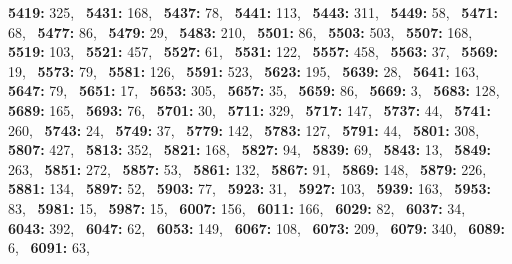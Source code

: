 \textbf{5419:} 325,\allowbreak~ 
\textbf{5431:} 168,\allowbreak~ 
\textbf{5437:} 78,\allowbreak~ 
\textbf{5441:} 113,\allowbreak~ 
\textbf{5443:} 311,\allowbreak~ 
\textbf{5449:} 58,\allowbreak~ 
\textbf{5471:} 68,\allowbreak~ 
\textbf{5477:} 86,\allowbreak~ 
\textbf{5479:} 29,\allowbreak~ 
\textbf{5483:} 210,\allowbreak~ 
\textbf{5501:} 86,\allowbreak~ 
\textbf{5503:} 503,\allowbreak~ 
\textbf{5507:} 168,\allowbreak~ 
\textbf{5519:} 103,\allowbreak~ 
\textbf{5521:} 457,\allowbreak~ 
\textbf{5527:} 61,\allowbreak~ 
\textbf{5531:} 122,\allowbreak~ 
\textbf{5557:} 458,\allowbreak~ 
\textbf{5563:} 37,\allowbreak~ 
\textbf{5569:} 19,\allowbreak~ 
\textbf{5573:} 79,\allowbreak~ 
\textbf{5581:} 126,\allowbreak~ 
\textbf{5591:} 523,\allowbreak~ 
\textbf{5623:} 195,\allowbreak~ 
\textbf{5639:} 28,\allowbreak~ 
\textbf{5641:} 163,\allowbreak~ 
\textbf{5647:} 79,\allowbreak~ 
\textbf{5651:} 17,\allowbreak~ 
\textbf{5653:} 305,\allowbreak~ 
\textbf{5657:} 35,\allowbreak~ 
\textbf{5659:} 86,\allowbreak~ 
\textbf{5669:} 3,\allowbreak~ 
\textbf{5683:} 128,\allowbreak~ 
\textbf{5689:} 165,\allowbreak~ 
\textbf{5693:} 76,\allowbreak~ 
\textbf{5701:} 30,\allowbreak~ 
\textbf{5711:} 329,\allowbreak~ 
\textbf{5717:} 147,\allowbreak~ 
\textbf{5737:} 44,\allowbreak~ 
\textbf{5741:} 260,\allowbreak~ 
\textbf{5743:} 24,\allowbreak~ 
\textbf{5749:} 37,\allowbreak~ 
\textbf{5779:} 142,\allowbreak~ 
\textbf{5783:} 127,\allowbreak~ 
\textbf{5791:} 44,\allowbreak~ 
\textbf{5801:} 308,\allowbreak~ 
\textbf{5807:} 427,\allowbreak~ 
\textbf{5813:} 352,\allowbreak~ 
\textbf{5821:} 168,\allowbreak~ 
\textbf{5827:} 94,\allowbreak~ 
\textbf{5839:} 69,\allowbreak~ 
\textbf{5843:} 13,\allowbreak~ 
\textbf{5849:} 263,\allowbreak~ 
\textbf{5851:} 272,\allowbreak~ 
\textbf{5857:} 53,\allowbreak~ 
\textbf{5861:} 132,\allowbreak~ 
\textbf{5867:} 91,\allowbreak~ 
\textbf{5869:} 148,\allowbreak~ 
\textbf{5879:} 226,\allowbreak~ 
\textbf{5881:} 134,\allowbreak~ 
\textbf{5897:} 52,\allowbreak~ 
\textbf{5903:} 77,\allowbreak~ 
\textbf{5923:} 31,\allowbreak~ 
\textbf{5927:} 103,\allowbreak~ 
\textbf{5939:} 163,\allowbreak~ 
\textbf{5953:} 83,\allowbreak~ 
\textbf{5981:} 15,\allowbreak~ 
\textbf{5987:} 15,\allowbreak~ 
\textbf{6007:} 156,\allowbreak~ 
\textbf{6011:} 166,\allowbreak~ 
\textbf{6029:} 82,\allowbreak~ 
\textbf{6037:} 34,\allowbreak~ 
\textbf{6043:} 392,\allowbreak~ 
\textbf{6047:} 62,\allowbreak~ 
\textbf{6053:} 149,\allowbreak~ 
\textbf{6067:} 108,\allowbreak~ 
\textbf{6073:} 209,\allowbreak~ 
\textbf{6079:} 340,\allowbreak~ 
\textbf{6089:} 6,\allowbreak~ 
\textbf{6091:} 63,\allowbreak~ 
